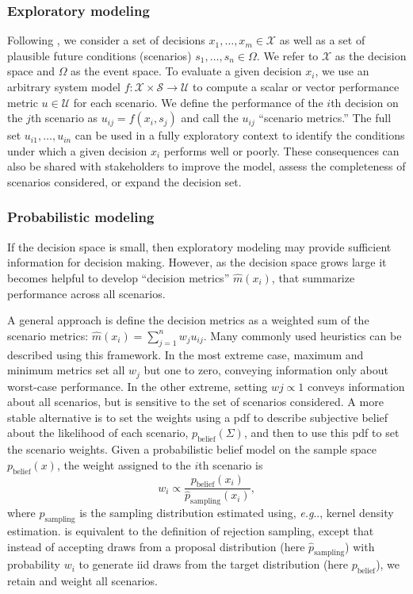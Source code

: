 \documentclass[12pt]{article}
\makeatletter
\DeclareRobustCommand\onedot{\futurelet\@let@token\@onedot}
\def\@onedot{\ifx\@let@token.\else.\null\fi\xspace}
\def\eg{\emph{e.g}\onedot} \def\Eg{\emph{E.g}\onedot}
\makeatother
\begin{document}
\subsubsection{Exploratory modeling}

Following \citet{mcphail_robustness:2019}, we consider a set of decisions $x_1, \ldots, x_m \in \mathcal{X}$ as well as a set of plausible future conditions (scenarios) $s_1, \ldots, s_n \in \Omega$.
We refer to $\mathcal{X}$ as the decision space and $\Omega$ as the event space.
To evaluate a given decision $x_i$, we use an arbitrary system model $f: \mathcal{X} \times \mathcal{S} \rightarrow \mathcal{U}$ to compute a scalar or vector performance metric $u \in \mathcal{U}$ for each scenario.
We define the performance of the $i$th decision on the $j$th scenario as $u_{ij} = f(x_i, s_j)$ and call the $u_{ij}$ ``scenario metrics.''
The full set $u_{i1}, \ldots, u_{in}$ can be used in a fully exploratory context \citep[\eg, scenario discovery;][]{kwakkel:2019,lamontagne_discovery:2018} to identify the conditions under which a given decision $x_i$ performs well or poorly.
These consequences can also be shared with stakeholders to improve the model, assess the completeness of scenarios considered, or expand the decision set.

\subsubsection{Probabilistic modeling}

If the decision space is small, then exploratory modeling may provide sufficient information for decision making.
However, as the decision space grows large it becomes helpful to develop ``decision metrics'' $\hat{m}(x_i)$, that summarize performance across all scenarios.

A general approach is define the decision metrics as a weighted sum of the scenario metrics: $\hat{m}(x_i) = \sum_{j=1}^n w_j u_{ij}$.
Many commonly used heuristics can be described using this framework.
In the most extreme case, maximum and minimum metrics set all $w_j$ but one to zero, conveying information only about worst-case performance.
In the other extreme, setting $wj \propto 1$ conveys information about all scenarios, but is sensitive to the set of scenarios considered.
A more stable alternative is to set the weights using a \gls{pdf} to describe subjective belief about the likelihood of each scenario, $p_\text{belief}(\Sigma)$, and then to use this \gls{pdf} to set the scenario weights.
Given a probabilistic belief model on the sample space $p_\text{belief}(x)$, the weight assigned to the $i$th scenario is
\begin{equation}\label{eq:scenario-weight}
    w_i \propto \frac{p_\text{belief}(x_i)}{\hat{p}_\text{sampling}(x_i)},
\end{equation}
where $\hat{p}_\text{sampling}$ is the sampling distribution estimated using, \eg, kernel density estimation.
 is equivalent to the definition of rejection sampling, except that instead of accepting draws from a proposal distribution (here $\hat{p}_\text{sampling}$) with probability $w_i$ to generate \gls{iid} draws from the target distribution (here $p_\text{belief}$), we retain and weight all scenarios.
\end{document}
